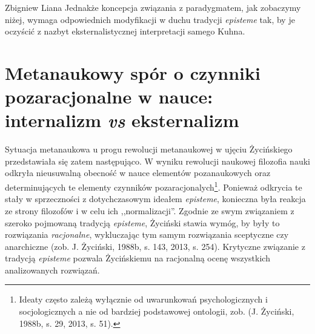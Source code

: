 \begin{artplenv}{Zbigniew Liana}
Jednakże koncepcja związania z paradygmatem, jak zobaczymy niżej, wymaga odpowiednich modyfikacji w duchu tradycji
\textit{episteme} tak, by je oczyścić z nazbyt eksternalistycznej interpretacji samego Kuhna.

\section{Metanaukowy spór o czynniki pozaracjonalne w nauce: internalizm \textit{vs} eksternalizm}

Sytuacja metanaukowa u progu rewolucji metanaukowej w ujęciu Życińskiego przedstawiała się zatem następująco. W wyniku
rewolucji naukowej filozofia nauki odkryła nieusuwalną obecność w nauce elementów pozanaukowych oraz determinujących te
elementy czynników pozaracjonalych\footnote{Ideaty często zależą wyłącznie od uwarunkowań psychologicznych i
	socjologicznych a nie od bardziej podstawowej ontologii, zob. \label{ref:RNDZ7VFgO3ocx}(J. Życiński, 1988b, s. 29,
	2013, s. 51).}. Ponieważ odkrycia te stały w sprzeczności z dotychczasowym ideałem \textit{episteme}, konieczna była
reakcja ze strony filozofów i w celu ich ,,normalizacji''. Zgodnie ze swym związaniem z szeroko pojmowaną tradycją
\textit{episteme}, Życiński stawia wymóg, by były to rozwiązania \textit{racjonalne}, wykluczając tym samym rozwiązania
sceptyczne czy anarchiczne \label{ref:RNDlHYNmrMqD0}(zob. J. Życiński, 1988b, s. 143, 2013, s. 254). Krytyczne
związanie z tradycją \textit{episteme} pozwala Życińskiemu na racjonalną ocenę wszystkich analizowanych rozwiązań.


\end{artplenv}
